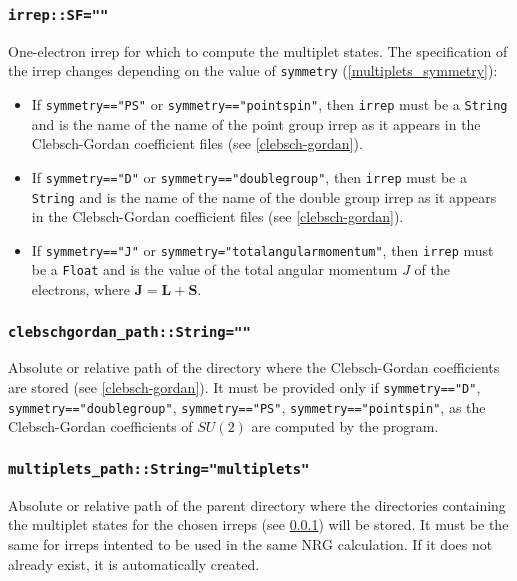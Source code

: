 \documentclass[notitlepage]{article}
\begin{document}
\subsubsection{\texttt{irrep::SF=""}}
\label{multiplets_irrep}
One-electron irrep for which to compute the multiplet
states. The specification of the irrep changes depending on
the value of \texttt{symmetry} (\ref{multiplets_symmetry}):
\begin{itemize}
    \item If \texttt{symmetry=="PS"} or
    \texttt{symmetry=="pointspin"}, then \texttt{irrep}
    must be a \texttt{String} and is the name of the name of
    the point group irrep as it appears in the
    Clebsch-Gordan coefficient files (see \ref{clebsch-gordan}).
    \item If \texttt{symmetry=="D"} or
    \texttt{symmetry=="doublegroup"}, then \texttt{irrep}
    must be a \texttt{String} and is the name of the name of
    the double group irrep as it appears in the
    Clebsch-Gordan coefficient files (see \ref{clebsch-gordan}).
    \item If \texttt{symmetry=="J"} or
    \texttt{symmetry="totalangularmomentum"}, then
    \texttt{irrep} must be a \texttt{Float} and is the value
    of the total angular momentum $J$ of the electrons,
    where $\mathbf J=\mathbf L + \mathbf S$.
\end{itemize}

\subsubsection{\texttt{clebschgordan\_path::String=""}}
\label{multiplets_clebschgordan}
Absolute or relative path of the directory where the
Clebsch-Gordan coefficients are stored (see
\ref{clebsch-gordan}). It must be provided only if
\texttt{symmetry=="D"}, \texttt{symmetry=="doublegroup"},
\texttt{symmetry=="PS"}, \texttt{symmetry=="pointspin"},
as the Clebsch-Gordan coefficients of $SU(2)$ are computed
by the program.

\subsubsection{\texttt{multiplets\_path::String="multiplets"}}
\label{multiplets_multipletspath}
Absolute or relative path of the parent directory where the
directories containing the multiplet states for the chosen
irreps (see \ref{multiplets_irrep}) will be stored. It must
be the same for irreps intented to be used in the same NRG
calculation. If it does not already exist, it is
automatically created.
\end{document}
